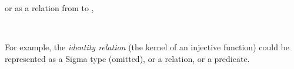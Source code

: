 \ccpad
or as a relation from  to ,
\ccpad
\begin{code}%
\>[1]\AgdaSpace{}%
\AgdaSymbol{:}\AgdaSpace{}%
\AgdaSymbol{\{}\AgdaSpace{}%
\AgdaSymbol{:}\AgdaSpace{}%
%
\AgdaSpace{}%
\AgdaSymbol{\}}\AgdaSpace{}%
\AgdaSymbol{\{}\AgdaSpace{}%
\AgdaSymbol{:}\AgdaSpace{}%
%
\AgdaSpace{}%
\AgdaSymbol{\}}\AgdaSpace{}%
\AgdaSpace{}%
\AgdaSymbol{(}\AgdaSpace{}%
\AgdaSpace{}%
\AgdaSymbol{)}\AgdaSpace{}%
\AgdaSpace{}%
\AgdaSpace{}%
\AgdaSpace{}%
\<%
\\
%
\>[1]\AgdaSpace{}%
\AgdaSpace{}%
\AgdaSpace{}%
\AgdaSpace{}%
\AgdaSymbol{=}\AgdaSpace{}%
\AgdaSpace{}%
\AgdaSpace{}%
\AgdaSpace{}%
\AgdaSpace{}%
\<%
\end{code}
\ccpad
For example, the \textit{identity relation} (the kernel of an injective function) could be represented as a Sigma type (omitted), or a relation, or a predicate.
\ccpad
